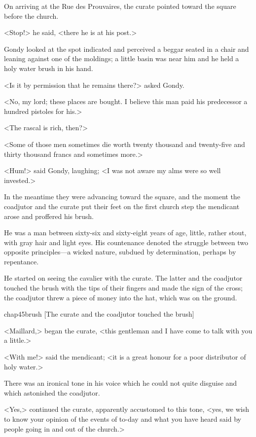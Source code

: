 On arriving at the Rue des Prouvaires, the curate pointed toward the square before the church.

<Stop!> he said, <there he is at his post.>

Gondy looked at the spot indicated and perceived a beggar seated in a chair and leaning against one of the moldings; a little basin was near him and he held a holy water brush in his hand.

<Is it by permission that he remains there?> asked Gondy.

<No, my lord; these places are bought. I believe this man paid his predecessor a hundred pistoles for his.>

<The rascal is rich, then?>

<Some of those men sometimes die worth twenty thousand and twenty-five and thirty thousand francs and sometimes more.>

<Hum!> said Gondy, laughing; <I was not aware my alms were so well invested.>

In the meantime they were advancing toward the square, and the moment the coadjutor and the curate put their feet on the first church step the mendicant arose and proffered his brush.

He was a man between sixty-six and sixty-eight years of age, little, rather stout, with gray hair and light eyes. His countenance denoted the struggle between two opposite principles—a wicked nature, subdued by determination, perhaps by repentance.

He started on seeing the cavalier with the curate. The latter and the coadjutor touched the brush with the tips of their fingers and made the sign of the cross; the coadjutor threw a piece of money into the hat, which was on the ground.

\begin{bwbigpic}
	[\basicscale] 
	{chap45brush}
	[The curate and the coadjutor touched the brush]
\end{bwbigpic}

<Maillard,> began the curate, <this gentleman and I have come to talk with you a little.>

<With me!> said the mendicant; <it is a great honour for a poor distributor of holy water.>

There was an ironical tone in his voice which he could not quite disguise and which astonished the coadjutor.

<Yes,> continued the curate, apparently accustomed to this tone, <yes, we wish to know your opinion of the events of to-day and what you have heard said by people going in and out of the church.>

